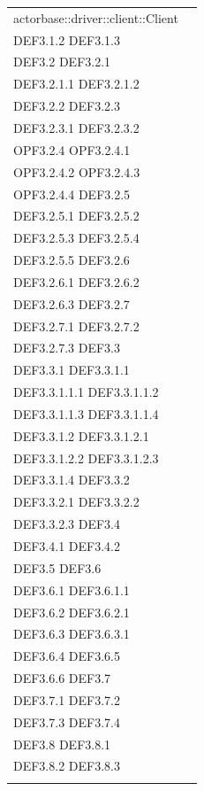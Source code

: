 \documentclass{scalatekids-article}
\begin{document}
\begin{longtable}[H]{|p{11.5cm}|p{5.5cm}|}
actorbase::driver::client::Client & \multiLineCell[t]{DEF3.1 DEF3.1.1\\DEF3.1.2 DEF3.1.3\\DEF3.2 DEF3.2.1\\DEF3.2.1.1 DEF3.2.1.2\\DEF3.2.2 DEF3.2.3\\DEF3.2.3.1 DEF3.2.3.2\\OPF3.2.4 OPF3.2.4.1\\OPF3.2.4.2 OPF3.2.4.3\\OPF3.2.4.4 DEF3.2.5\\DEF3.2.5.1 DEF3.2.5.2\\DEF3.2.5.3 DEF3.2.5.4\\DEF3.2.5.5 DEF3.2.6\\DEF3.2.6.1 DEF3.2.6.2\\DEF3.2.6.3 DEF3.2.7\\DEF3.2.7.1 DEF3.2.7.2\\DEF3.2.7.3 DEF3.3\\DEF3.3.1 DEF3.3.1.1\\DEF3.3.1.1.1 DEF3.3.1.1.2\\DEF3.3.1.1.3 DEF3.3.1.1.4\\DEF3.3.1.2 DEF3.3.1.2.1\\DEF3.3.1.2.2 DEF3.3.1.2.3\\DEF3.3.1.4 DEF3.3.2\\DEF3.3.2.1 DEF3.3.2.2\\DEF3.3.2.3 DEF3.4\\DEF3.4.1 DEF3.4.2\\DEF3.5 DEF3.6\\DEF3.6.1 DEF3.6.1.1\\DEF3.6.2 DEF3.6.2.1\\DEF3.6.3 DEF3.6.3.1\\DEF3.6.4 DEF3.6.5\\DEF3.6.6 DEF3.7\\DEF3.7.1 DEF3.7.2\\DEF3.7.3 DEF3.7.4\\DEF3.8 DEF3.8.1\\DEF3.8.2 DEF3.8.3\\}\\
\hline

\end{longtable}
\end{document}
